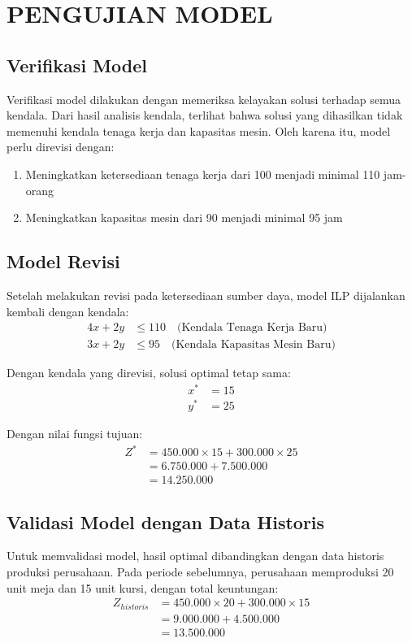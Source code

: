 \documentclass[twocolumn]{article}
\begin{document}
\section{PENGUJIAN MODEL}
\subsection{Verifikasi Model}
Verifikasi model dilakukan dengan memeriksa kelayakan solusi terhadap semua kendala. Dari hasil analisis kendala, terlihat bahwa solusi yang dihasilkan tidak memenuhi kendala tenaga kerja dan kapasitas mesin. Oleh karena itu, model perlu direvisi dengan:
\begin{enumerate}
    \item Meningkatkan ketersediaan tenaga kerja dari 100 menjadi minimal 110 jam-orang
    \item Meningkatkan kapasitas mesin dari 90 menjadi minimal 95 jam
\end{enumerate}

\subsection{Model Revisi}
Setelah melakukan revisi pada ketersediaan sumber daya, model ILP dijalankan kembali dengan kendala:
\begin{align}
4x + 2y &\leq 110 \quad \text{(Kendala Tenaga Kerja Baru)} \\
3x + 2y &\leq 95 \quad \text{(Kendala Kapasitas Mesin Baru)}
\end{align}

Dengan kendala yang direvisi, solusi optimal tetap sama:
\begin{align}
x^* &= 15 \\
y^* &= 25
\end{align}

Dengan nilai fungsi tujuan:
\begin{align}
Z^* &= 450.000 \times 15 + 300.000 \times 25 \\
&= 6.750.000 + 7.500.000 \\
&= 14.250.000
\end{align}

\subsection{Validasi Model dengan Data Historis}
Untuk memvalidasi model, hasil optimal dibandingkan dengan data historis produksi perusahaan. Pada periode sebelumnya, perusahaan memproduksi 20 unit meja dan 15 unit kursi, dengan total keuntungan:
\begin{align}
Z_{historis} &= 450.000 \times 20 + 300.000 \times 15 \\
&= 9.000.000 + 4.500.000 \\
&= 13.500.000
\end{align}
\end{document}

